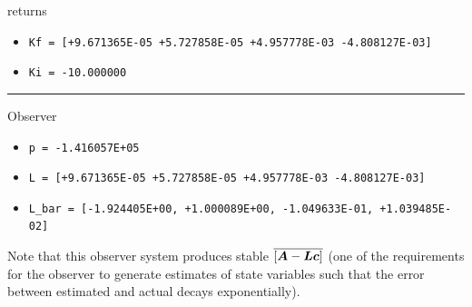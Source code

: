 returns
\begin{itemize}
    \item \texttt{Kf = [+9.671365E-05 +5.727858E-05 +4.957778E-03 -4.808127E-03]}
    \item \texttt{Ki = -10.000000}
\end{itemize}
\rule{\textwidth}{0.5pt}
Observer
\begin{itemize}
    \item \texttt{p = -1.416057E+05}
    \item \texttt{L = [+9.671365E-05 +5.727858E-05 +4.957778E-03 -4.808127E-03]}
    \item \texttt{L\_bar = [-1.924405E+00, +1.000089E+00, -1.049633E-01, +1.039485E-02]}
\end{itemize}
Note that this observer system produces stable $\overline{\left[\boldsymbol{A} - \boldsymbol{L}\boldsymbol{c}\right]}$ (one of the requirements for the observer to generate estimates of state variables such that the error between estimated and actual decays exponentially).
